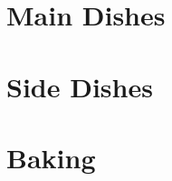 \documentclass[a4paper]{recipe}
\begin{document}

\chapter{Main Dishes}



\chapter{Side Dishes}

\chapter{Baking}



\tableofcontents
\end{document}
